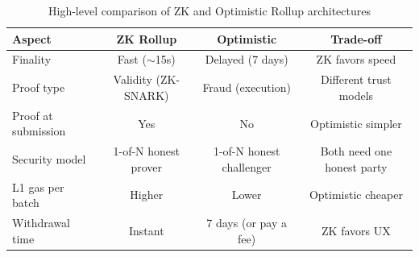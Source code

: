\begin{table}[h]
    \centering
    \begin{tabular}{l|c|c|c}
        \hline
        \textbf{Aspect} & \textbf{ZK Rollup} & \textbf{Optimistic} & \textbf{Trade-off} \\
        \hline
        Finality & Fast ($\sim$15s) & Delayed (7 days) & ZK favors speed \\
        \hline
        Proof type & Validity (ZK-SNARK) & Fraud (execution) & Different trust models \\
        \hline
        Proof at submission & Yes & No & Optimistic simpler \\
        \hline
        Security model & 1-of-N honest prover & 1-of-N honest challenger & Both need one honest party \\
        \hline
        L1 gas per batch & Higher & Lower & Optimistic cheaper \\
        \hline
        Withdrawal time & Instant & 7 days (or pay a fee) & ZK favors UX \\
        \hline
    \end{tabular}
    \caption{High-level comparison of ZK and Optimistic Rollup architectures}
    \label{tab:comparison-overview}
\end{table}
